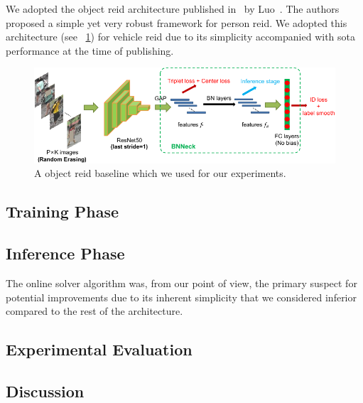 We adopted the object \gls{reid} architecture published in~\cite{luo2019bagoftricksreid} by Luo~\etal{}. The authors proposed a simple yet very robust framework for person \gls{reid}. We adopted this architecture (see \figtext{}~\ref{fig:BagOfTricksReIDArchitecture}) for vehicle \gls{reid} due to its simplicity accompanied with \gls{sota} performance at the time of publishing.

\begin{figure}[t]
    \centering
    \includegraphics[width=\linewidth]{figures/methodology/bagoftricks_reid_architecture.pdf}
    \caption[Gls{reid} baseline]{A object \gls{reid} baseline which we used for our experiments. }
    \label{fig:BagOfTricksReIDArchitecture}
\end{figure}

\subsection{Training Phase}

\subsection{Inference Phase}

The online solver algorithm was, from our point of view, the primary suspect for potential improvements due to its inherent simplicity that we considered inferior compared to the rest of the architecture.

\subsection{Experimental Evaluation}

\subsection{Discussion}